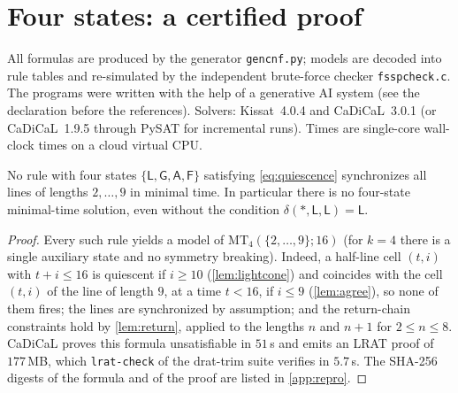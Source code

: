 \section{Four states: a certified proof}\label{sec:four}

All formulas are produced by the generator \texttt{gencnf.py}; models are
decoded into rule tables and re-simulated by the independent brute-force
checker \texttt{fsspcheck.c}. The programs were written with the help of a
generative AI system (see the declaration before the references). Solvers: Kissat~4.0.4 \cite{Kissat20} and
CaDiCaL~3.0.1 \cite{CaDiCaL2} (or CaDiCaL~1.9.5 through PySAT
\cite{PySAT18} for incremental runs). Times are single-core wall-clock times
on a cloud virtual CPU.

\begin{theorem}\label{thm:four}
No rule with four states $\{\mathsf L,\mathsf G,\mathsf A,\mathsf F\}$ satisfying
\eqref{eq:quiescence} synchronizes all lines of lengths $2,\dots,9$ in
minimal time. In particular there is no four-state minimal-time solution,
even without the condition $\delta(\ast,\mathsf L,\mathsf L)=\mathsf L$.
\end{theorem}

\begin{proof}
Every such rule yields a model of $\mathrm{MT}_4(\{2,\dots,9\};16)$ (for
$k=4$ there is a single auxiliary state and no symmetry breaking). Indeed, a
half-line cell $(t,i)$ with $t+i\le16$ is quiescent if $i\ge10$
(\cref{lem:lightcone}) and coincides with the cell $(t,i)$ of the line of
length $9$, at a time $t<16$, if $i\le9$ (\cref{lem:agree}), so none of
them fires; the lines are synchronized by assumption; and the return-chain
constraints hold by \cref{lem:return}, applied to the lengths $n$ and $n+1$
for $2\le n\le8$. CaDiCaL proves this
formula unsatisfiable in $51$\,s and emits an LRAT proof
\cite{CruzFilipeEtAl17} of $177$\,MB, which \texttt{lrat-check} of the \textsf{drat-trim}
suite \cite{WetzlerHeuleHunt14} verifies in $5.7$\,s. The SHA-256 digests of
the formula and of the proof are listed in \ref{app:repro}.
\end{proof}


